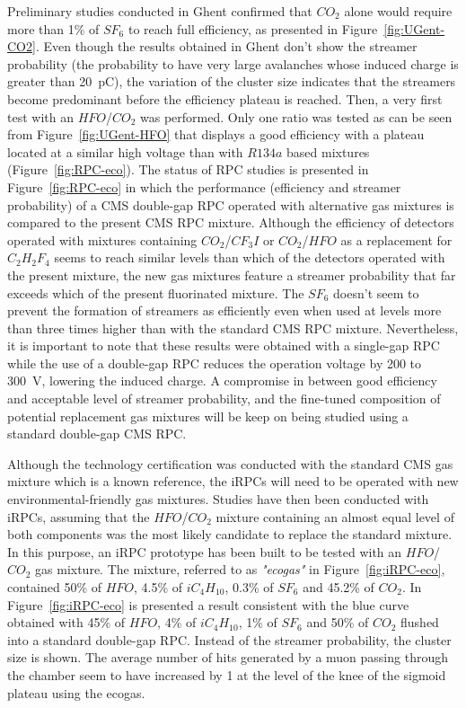 	Preliminary studies conducted in Ghent confirmed that $CO_2$ alone would require more than 1\% of $SF_6$ to reach full efficiency, as presented in Figure~\ref{fig:UGent-CO2}. Even though the results obtained in Ghent don't show the streamer probability (the probability to have very large avalanches whose induced charge is greater than \SI{20}{pC}), the variation of the cluster size indicates that the streamers become predominant before the efficiency plateau is reached. Then, a very first test with an $HFO$/$CO_2$ was performed. Only one ratio was tested as can be seen from Figure~\ref{fig:UGent-HFO} that displays a good efficiency with a plateau located at a similar high voltage than with $R134a$ based mixtures (Figure~\ref{fig:RPC-eco}). The status of RPC studies is presented in Figure~\ref{fig:RPC-eco} in which the performance (efficiency and streamer probability) of a CMS double-gap RPC operated with alternative gas mixtures is compared to the present CMS RPC mixture. Although the efficiency of detectors operated with mixtures containing $CO_2$/$CF_3I$ or $CO_2$/$HFO$ as a replacement for $C_2H_2F_4$ seems to reach similar levels than which of the detectors operated with the present mixture, the new gas mixtures feature a streamer probability that far exceeds which of the present fluorinated mixture. The $SF_6$ doesn't seem to prevent the formation of streamers as efficiently even when used at levels more than three times higher than with the standard CMS RPC mixture. Nevertheless, it is important to note that these results were obtained with a single-gap RPC while the use of a double-gap RPC reduces the operation voltage by 200 to \SI{300}{V}, lowering the induced charge. A compromise in between good efficiency and acceptable level of streamer probability, and the fine-tuned composition of potential replacement gas mixtures will be keep on being studied using a standard double-gap CMS RPC.
	
\endgroup
	
	Although the technology certification was conducted with the standard CMS gas mixture which is a known reference, the iRPCs will need to be operated with new environmental-friendly gas mixtures. Studies have then been conducted with iRPCs, assuming that the $HFO$/$CO_2$ mixture containing an almost equal level of both components was the most likely candidate to replace the standard mixture. In this purpose, an iRPC prototype has been built to be tested with an $HFO$/$CO_2$ gas mixture. The mixture, referred to as \textit{"ecogas"} in Figure~\ref{fig:iRPC-eco}, contained 50\% of $HFO$, 4.5\% of $iC_4H_{10}$, 0.3\% of $SF_6$ and 45.2\% of $CO_2$. In Figure~\ref{fig:iRPC-eco} is presented a result consistent with the blue curve obtained with 45\% of $HFO$, 4\% of $iC_4H_{10}$, 1\% of $SF_6$ and 50\% of $CO_2$ flushed into a standard double-gap RPC. Instead of the streamer probability, the cluster size is shown. The average number of hits generated by a muon passing through the chamber seem to have increased by 1 at the level of the knee of the sigmoid plateau using the ecogas.

